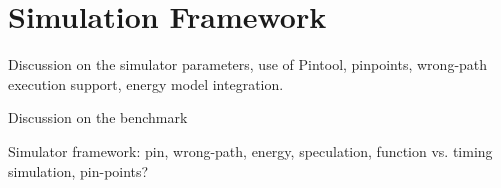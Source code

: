 \section{Simulation Framework}
\label{sec:simulation}

Discussion on the simulator parameters, use of Pintool, pinpoints, wrong-path
execution support, energy model integration.

Discussion on the benchmark

Simulator framework: pin, wrong-path, energy, speculation, function vs. timing
simulation, pin-points?
